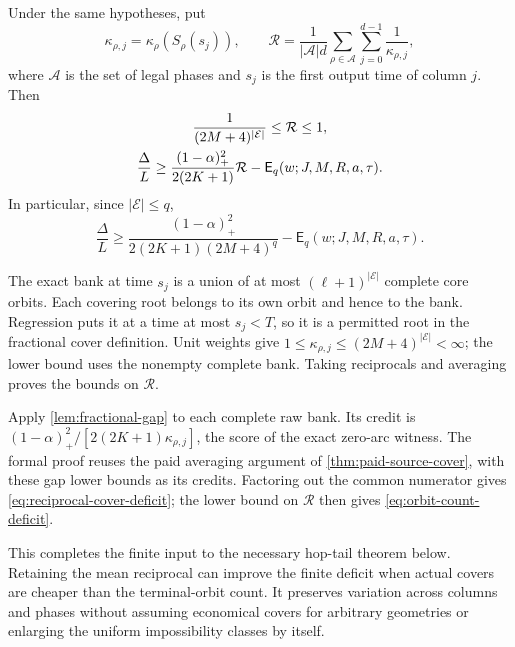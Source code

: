 \begin{corollary}\label{cor:orbit-count-deficit}
Under the same hypotheses, put
\[
 \kappa_{\rho,j}=\kappa_\rho(S_\rho(s_j)),\qquad
 \mathcal R=\frac1{|\mathcal A|d}
       \sum_{\rho\in\mathcal A}\sum_{j=0}^{d-1}\frac1{\kappa_{\rho,j}},
\]
where $\mathcal A$ is the set of legal phases and $s_j$ is the first
output time of column $j$. Then
\begin{gather}
 \frac1{(2M+4)^{|\mathcal E|}}\le\mathcal R\le1,\notag\\
 \frac\Delta L\ge
 \frac{(1-\alpha)_+^2}{2(2K+1)}\mathcal R
 -\mathsf E_q(w;J,M,R,a,\tau).\label{eq:reciprocal-cover-deficit}
\end{gather}
In particular, since $|\mathcal E|\le q$,
\begin{equation}\label{eq:orbit-count-deficit}
 \frac\Delta L\ge
 \frac{(1-\alpha)_+^2}{2(2K+1)(2M+4)^q}
 -\mathsf E_q(w;J,M,R,a,\tau).
\end{equation}
\end{corollary}
\begin{outline}
The exact bank at time $s_j$ is a union of at most
$(\ell+1)^{|\mathcal E|}$ complete core orbits. Each covering root
belongs to its own orbit and hence to the bank. Regression puts it
at a time at most $s_j<T$, so it is a permitted root in the fractional
cover definition. Unit weights give
$1\le\kappa_{\rho,j}\le(2M+4)^{|\mathcal E|}<\infty$;
the lower bound uses the nonempty complete bank. Taking reciprocals
and averaging proves the bounds on $\mathcal R$.

Apply \cref{lem:fractional-gap} to each complete raw bank. Its credit
is $(1-\alpha)_+^2/[2(2K+1)\kappa_{\rho,j}]$, the score of the exact
zero-arc witness. The formal proof reuses the paid averaging argument
of \cref{thm:paid-source-cover}, with these gap lower bounds as its
credits. Factoring out the common numerator gives
\cref{eq:reciprocal-cover-deficit}; the lower bound on $\mathcal R$
then gives \cref{eq:orbit-count-deficit}.
\end{outline}

This completes the finite input to the necessary hop-tail theorem below.
Retaining the mean reciprocal can improve the finite deficit when actual
covers are cheaper than the terminal-orbit count. It preserves variation
across columns and phases without assuming economical covers for arbitrary
geometries or enlarging the uniform impossibility classes by itself.

